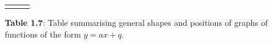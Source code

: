 \begin{center}
\begin{xtabular*}{\mytablewidth}[t]{|p{10\mystarwidth}|p{10\mystarwidth}|p{10\mystarwidth}|}
\begin{center}
      \vspace{2pt}
    \vspace{.1in}
    
    \end{center}



    \addtocounter{footnote}{-0}
    
     \tabularnewline{}
    \end{xtabular*}
      \end{center}
    \begin{center}{\small\bfseries Table 1.7}: Table summarising general shapes and positions of graphs of functions of the form \begin{math}y=ax+q\end{math}.\end{center}
    
    \addtocounter{footnote}{-0}
    
    \par
        \label{m39338*uid83}
            \nopagebreak
            
